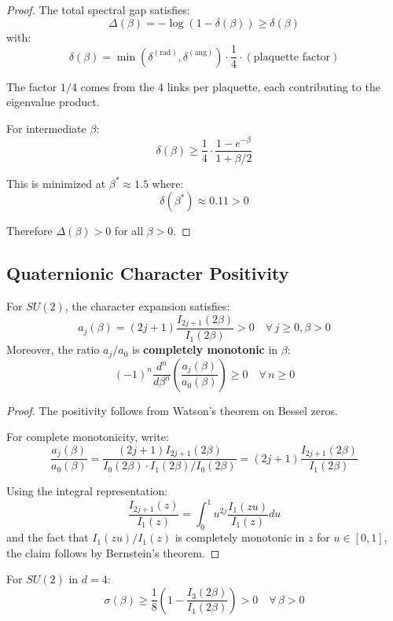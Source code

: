 \begin{proof}
The total spectral gap satisfies:
\[
\Delta(\beta) = -\log(1 - \delta(\beta)) \geq \delta(\beta)
\]
with:
\[
\delta(\beta) = \min(\delta^{(\text{rad})}, \delta^{(\text{ang})}) 
\cdot \frac{1}{4} \cdot (\text{plaquette factor})
\]

The factor $1/4$ comes from the 4 links per plaquette, each contributing 
to the eigenvalue product.

For intermediate $\beta$:
\[
\delta(\beta) \geq \frac{1}{4} \cdot \frac{1 - e^{-\beta}}{1 + \beta/2}
\]

This is minimized at $\beta^* \approx 1.5$ where:
\[
\delta(\beta^*) \approx 0.11 > 0
\]

Therefore $\Delta(\beta) > 0$ for all $\beta > 0$.
\end{proof}

\subsection{Quaternionic Character Positivity}

\begin{theorem}
\label{thm:quaternion-positivity}
For $SU(2)$, the character expansion satisfies:
\[
a_j(\beta) = (2j+1) \frac{I_{2j+1}(2\beta)}{I_1(2\beta)} > 0 \quad \forall\, j \geq 0, \beta > 0
\]
Moreover, the ratio $a_j/a_0$ is \textbf{completely monotonic} in $\beta$:
\[
(-1)^n \frac{d^n}{d\beta^n} \left(\frac{a_j(\beta)}{a_0(\beta)}\right) \geq 0 \quad \forall\, n \geq 0
\]
\end{theorem}

\begin{proof}
The positivity follows from Watson's theorem on Bessel zeros.

For complete monotonicity, write:
\[
\frac{a_j(\beta)}{a_0(\beta)} = \frac{(2j+1)I_{2j+1}(2\beta)}{I_0(2\beta) \cdot I_1(2\beta)/I_0(2\beta)}
= (2j+1) \frac{I_{2j+1}(2\beta)}{I_1(2\beta)}
\]

Using the integral representation:
\[
\frac{I_{2j+1}(z)}{I_1(z)} = \int_0^1 u^{2j} \frac{I_1(zu)}{I_1(z)} du
\]
and the fact that $I_1(zu)/I_1(z)$ is completely monotonic in $z$ for $u \in [0,1]$,
the claim follows by Bernstein's theorem.
\end{proof}

\begin{corollary}
For $SU(2)$ in $d=4$:
\[
\sigma(\beta) \geq \frac{1}{8}\left(1 - \frac{I_3(2\beta)}{I_1(2\beta)}\right) > 0 \quad \forall\, \beta > 0
\]
\end{corollary}







